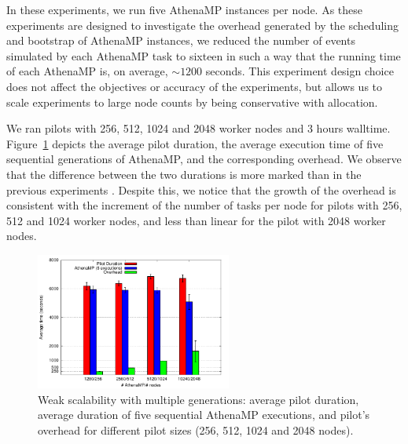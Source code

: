 In these experiments, we run five AthenaMP instances per node.  As these
experiments are designed to investigate the overhead generated by the
scheduling and bootstrap of AthenaMP instances, we reduced the number of
events simulated by each AthenaMP task to sixteen in such a way that the
running time of each AthenaMP is, on average, $\sim 1200$ seconds. This
experiment design choice does not affect the  objectives or accuracy of the
experiments, but allows us to scale experiments to large node counts by being
conservative with allocation.


We ran
pilots
with 256, 512, 1024 and 2048 worker nodes and
3 hours walltime. Figure~\ref{fig:weakScal2a} depicts the average
pilot duration, the average execution time of five sequential
generations of AthenaMP, and the corresponding overhead. We
observe that the difference between the two durations is more marked than in the
previous experiments . Despite this, we notice that the growth of the overhead is consistent with the increment of the number of tasks per node for pilots with 256, 512 and 1024 worker nodes, and less than linear for the pilot with 2048 worker nodes.

\begin{figure}[!htb]
        \includegraphics[height=4.5cm,width=\columnwidth]{./figures/NGE/weak2.pdf}
    \caption{Weak scalability with multiple generations: average pilot
    duration, average duration of five sequential AthenaMP executions, and
    pilot's overhead for different pilot sizes (256, 512, 1024 and 2048 nodes).}
\label{fig:weakScal2a}
\end{figure}

